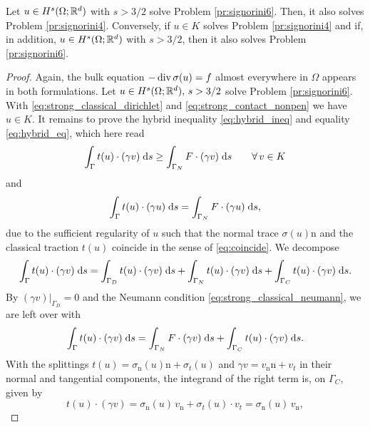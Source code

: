 \begin{proposition}
	Let $u\in H^s(\Omega;{\mathbb R}^d)$ with $s>3/2$ solve Problem \ref{pr:signorini6}. Then, it also solves Problem \ref{pr:signorini4}. Conversely, if $u\in K$ solves Problem \ref{pr:signorini4} and if, in addition, $u\in H^s(\Omega;{\mathbb R}^d)$ with $s>3/2$, then it also solves Problem \ref{pr:signorini6}.
\end{proposition}
\begin{proof}
	Again, the bulk equation $-\diver\sigma(u) = f$ almost everywhere in $\Omega$ appears in both formulations. Let $u\in H^s(\Omega;{\mathbb R}^d),\, s>3/2$ solve Problem \ref{pr:signorini6}. With \eqref{eq:strong_classical_dirichlet} and \eqref{eq:strong_contact_nonpen} we have $u\in K$. It remains to prove the hybrid inequality \eqref{eq:hybrid_ineq} and equality \eqref{eq:hybrid_eq}, which here read
	\begin{equation}\label{eq:hybineq}
		\int_\Gamma t(u)\cdot(\gamma v)\;{{\mathrm{d}} s} \ge \int_{\Gamma_N}F\cdot(\gamma v)\;{{\mathrm{d}} s}\qquad \forall\,v\in K
	\end{equation}
	and
	\begin{equation}\label{eq:hybeq}
		\int_\Gamma t(u)\cdot(\gamma u)\;{{\mathrm{d}} s} = \int_{\Gamma_N} F\cdot(\gamma u)\;{{\mathrm{d}} s},
	\end{equation}
	due to the sufficient regularity of $u$ such that the normal trace $\sigma(u)\mathrm{n}$ and the classical traction $t(u)$ coincide in the sense of \eqref{eq:coincide}. We decompose
	\begin{equation}\label{eq:decompint}
		\int_\Gamma t(u)\cdot(\gamma v) \;{{\mathrm{d}} s} = \int_{\Gamma_D}t(u)\cdot(\gamma v) \;{{\mathrm{d}} s}+\int_{\Gamma_N}t(u)\cdot(\gamma v) \;{{\mathrm{d}} s}+\int_{\Gamma_C}t(u)\cdot(\gamma v) \;{{\mathrm{d}} s}.
	\end{equation}
	By $(\gamma v)|_{\Gamma_D} = 0$ and the Neumann condition \eqref{eq:strong_classical_neumann}, we are left over with
	\begin{equation*}
		\int_\Gamma t(u)\cdot(\gamma v)\;{{\mathrm{d}} s} = \int_{\Gamma_N}F\cdot(\gamma v)\;{{\mathrm{d}} s} + \int_{\Gamma_C} t(u)\cdot(\gamma v)\;{{\mathrm{d}} s}.
	\end{equation*}
	With the splittings $t(u) = \sigma_\mathrm{n}(u)\mathrm{n}+\sigma_t(u)$ and $\gamma v = v_\mathrm{n}\mathrm{n}+v_t$ in their normal and tangential components, the integrand of the right term is, on $\Gamma_C$, given by
	\begin{equation*}
		t(u) \cdot(\gamma v) = \sigma_\mathrm{n}(u)\,v_\mathrm{n} + \sigma_t(u)\cdot v_t = \sigma_\mathrm{n}(u)\,v_\mathrm{n},

\end{equation*}
\end{proof}
